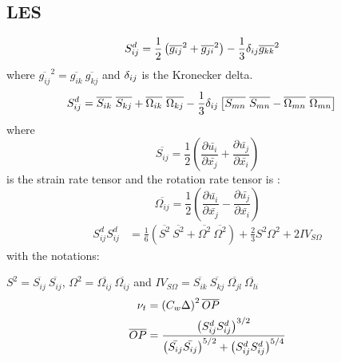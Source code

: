 \subsection{LES}
%
\begin{equation}
\label{traceless tensor}
\begin{split}
{{S}^d_{ij}} &= \frac{1}{2}\left(\overline{g_{ij}}^2 + \overline{g_{ji}}^2 \right) - \frac{1}{3}\delta_{ij}\overline{g_{kk}}^2
\end{split}
\end{equation}
%
where $ \overline{g_{ij}}^2 = \overline{g_{ik}}\  \overline{g_{kj}} $ and $\delta_{ij}$ is the Kronecker delta.
%
\begin{equation}
\label{traceless tensor-1}
\begin{split}
{{S}^d_{ij}} &= \overline{S_{ik}}\  \overline{S_{kj}} + \overline{\Omega_{ik}}\  \overline{\Omega_{kj}} - \frac{1}{3}\delta_{ij}\left[\overline{S_{mn}}\  \overline{S_{mn}} - \overline{\Omega_{mn}}\  \overline{\Omega_{mn}}\right]
\end{split}
\end{equation}
%
where $$\overline{S_{ij}} = \frac{1}{2}\left(\frac{\partial{\bar{u_i}}}{\partial{\bar{x_j}}} + \frac{\partial{\bar{u_j}}}{\partial{\bar{x_i}}}\right)$$ is the strain rate tensor and the rotation rate tensor is : $$\overline{\Omega_{ij}} = \frac{1}{2}\left(\frac{\partial{\bar{u_i}}}{\partial{\bar{x_j}}} - \frac{\partial{\bar{u_j}}}{\partial{\bar{x_i}}}\right)$$
%
%
\begin{equation}
\label{traceless tensor-2}
\begin{split}
{{S}^d_{ij}}{{S}^d_{ij}} &= \frac{1}{6}\left(\overline{S^2}\  \overline{S^2} + \overline{\Omega^2}\  \overline{\Omega^2}\right)  + \frac{2}{3}{S^2}{\Omega^2} +2IV_{S\Omega}
\end{split}
\end{equation}
%
with the notations:

${S^2} = \overline{S_{ij}}\ \overline{S_{ij}}$, ${\Omega^2} = \overline{\Omega_{ij}}\ \overline{\Omega_{ij}}$ and $IV_{S\Omega} = \overline{S_{ik}}\ \overline{S_{kj}}\ \overline{\Omega_{jl}}\ \overline{\Omega_{li}}$
\begin{equation}
\label{eddy-viscosity}
\begin{split}
{\nu_t} &= \left({C_w}{\Delta}\right)^{2} \overline{OP}\\
\overline{OP} &= \frac{\left({S_{ij}^{d}}{S_{ij}^{d}}\right)^{3/2}}{\left(\bar{S_{ij}} \bar{S_{ij}}\right)^{5/2} + {\left({S_{ij}^{d}}{S_{ij}^{d}}\right)^{5/4}}}
\end{split}
\end{equation}
%